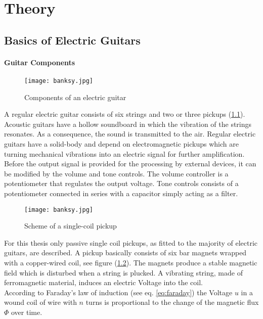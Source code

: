 \newpage
\chapter{Theory} 
\section{Basics of Electric Guitars}
\subsubsection{Guitar Components}

\begin{figure}[H]
	\centering \texttt{[image: banksy.jpg]}
	\caption[ElectricGuitar]{Components of an electric guitar\footnotemark}
	\label{fig:ElectricGuitar}
\end{figure}

A regular electric guitar consists of six strings and two or three pickups (\ref{fig:ElectricGuitar}).
Acoustic guitars have a hollow soundboard in which the vibration of the strings resonates. As a consequence, the sound is transmitted to the air. Regular electric guitars have a solid-body and depend on electromagnetic
pickups which are turning mechanical vibrations into an electric signal for further amplification.\\
Before the output signal is provided for the processing by external devices, it can be modified
by the volume and tone controls. The volume controller is a potentiometer that regulates the output voltage.
Tone controls consists of a potentiometer connected in series with a capacitor simply acting as a filter.


\begin{figure}[H]
	\centering \texttt{[image: banksy.jpg]}
	\caption[SingleCoil]{Scheme of a single-coil pickup \cite[p 29]{Zollner:2009}}
	\label{fig:SingleCoil}
\end{figure}

For this thesis only passive single coil pickups, as fitted to the majority of electric guitars, are described.
A pickup basically consists of six bar magnets wrapped with a copper-wired coil, see figure (\ref{fig:SingleCoil}).
The magnets produce a stable magnetic field which is disturbed when a string is plucked.
A vibrating string, made of ferromagnetic material, induces an electric Voltage into the coil.\\
According to Faraday's law of induction (see eq. \ref{eq:faraday}) the Voltage $u$ in a wound coil of wire with $n$ turns is proportional to the change of the magnetic flux $\Phi$ over time.


